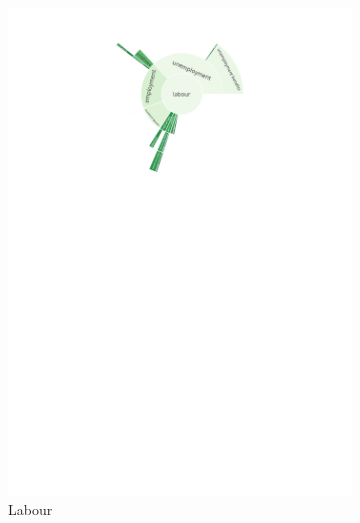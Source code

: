 \begin{figure}[!htbp]
\begin{subfigure}{0.45\textwidth}
		\includegraphics[trim={0 0 0 0},clip,width=\linewidth]{figures/baly_iptc_weighted_prop_leaning_corr_tfidf_zoom_labour.pdf}
		\caption{Labour}
            \label{fig:baly_iptc_weighted_prop_leaning_corr_tfidf_zoom_labour}
	\end{subfigure}
	\begin{subfigure}{0.45\textwidth}
            \centering

\end{subfigure}
\end{figure}
